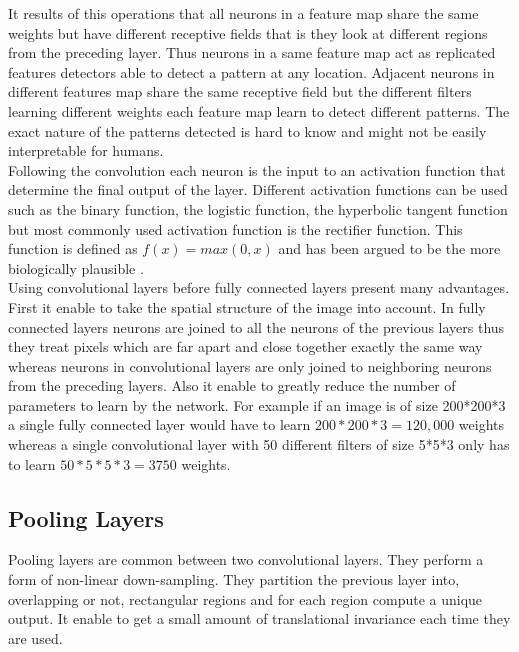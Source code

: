     It results of this operations that all neurons in a feature map share the same weights but have different receptive fields that is they look at different regions from the preceding layer. Thus neurons in a same feature map act as replicated features detectors able to detect a pattern at any location. Adjacent neurons in different features map share the same receptive field but the different filters learning different weights each feature map learn to detect different patterns. The exact nature of the patterns detected is hard to know and might not be easily interpretable for humans. \\
    Following the convolution each neuron is the input to an activation function that determine the final output of the layer. Different activation functions can be used such as the binary function, the logistic function, the hyperbolic tangent function but most commonly used activation function is the rectifier function. This function is defined as \( f(x) = max(0,x) \) and has been argued to be the more biologically plausible \cite{glorot2011deep}.
    \\
    Using convolutional layers before fully connected layers present many advantages. First it enable to take the spatial structure of the image into account. In fully connected layers neurons are joined to all the neurons of the previous layers thus they treat pixels which are far apart and close together exactly the same way whereas neurons in convolutional layers are only joined to neighboring neurons from the preceding layers. Also it enable to greatly reduce the number of parameters to learn by the network. For example if an image is of size 200*200*3 a single fully connected layer would have to learn \( 200*200*3 = 120,000 \) weights whereas a single convolutional layer with 50 different filters of size 5*5*3 only has to learn \( 50*5*5*3 = 3750 \) weights.

    \subsection{Pooling Layers}

    Pooling layers are common between two convolutional layers. They perform a form of non-linear down-sampling. They partition the previous layer into, overlapping or not, rectangular regions and for each region compute a unique output. It enable to get a small amount of translational invariance each time they are used.

